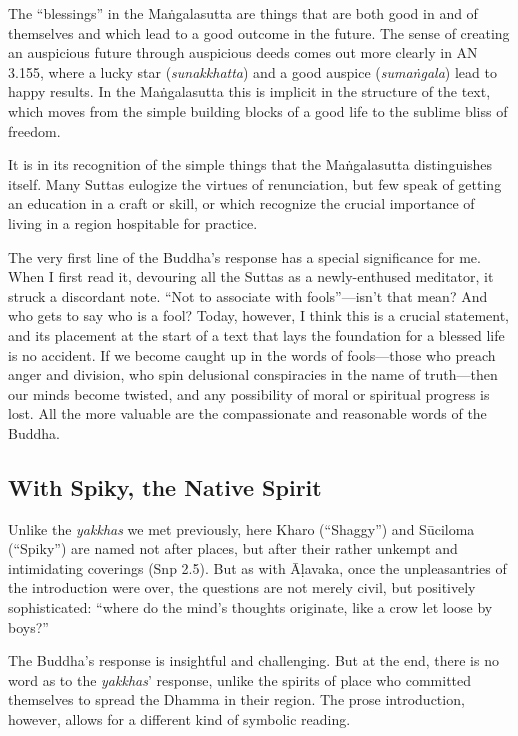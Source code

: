 \documentclass[12pt,openany]{book}%
\begin{document}
The “blessings” in the \textsanskrit{Maṅgalasutta} are things that are both good in and of themselves and which lead to a good outcome in the future. The sense of creating an auspicious future through auspicious deeds comes out more clearly in AN 3.155, where a lucky star (\textit{sunakkhatta}) and a good auspice (\textit{\textsanskrit{sumaṅgala}}) lead to happy results. In the \textsanskrit{Maṅgalasutta} this is implicit in the structure of the text, which moves from the simple building blocks of a good life to the sublime bliss of freedom.

It is in its recognition of the simple things that the \textsanskrit{Maṅgalasutta} distinguishes itself. Many Suttas eulogize the virtues of renunciation, but few speak of getting an education in a craft or skill, or which recognize the crucial importance of living in a region hospitable for practice.

The very first line of the Buddha’s response has a special significance for me. When I first read it, devouring all the Suttas as a newly-enthused meditator, it struck a discordant note. “Not to associate with fools”—isn’t that mean? And who gets to say who is a fool? Today, however, I think this is a crucial statement, and its placement at the start of a text that lays the foundation for a blessed life is no accident. If we become caught up in the words of fools—those who preach anger and division, who spin delusional conspiracies in the name of truth—then our minds become twisted, and any possibility of moral or spiritual progress is lost. All the more valuable are the compassionate and reasonable words of the Buddha.

\subsection*{With Spiky, the Native Spirit}

Unlike the \textit{yakkhas} we met previously, here Kharo (“Shaggy”) and \textsanskrit{Sūciloma} (“Spiky”) are named not after places, but after their rather unkempt and intimidating coverings (Snp 2.5). But as with \textsanskrit{Āḷavaka}, once the unpleasantries of the introduction were over, the questions are not merely civil, but positively sophisticated: “where do the mind’s thoughts originate, like a crow let loose by boys?”

The Buddha’s response is insightful and challenging. But at the end, there is no word as to the \textit{yakkhas}’ response, unlike the spirits of place who committed themselves to spread the Dhamma in their region. The prose introduction, however, allows for a different kind of symbolic reading.
\end{document}

